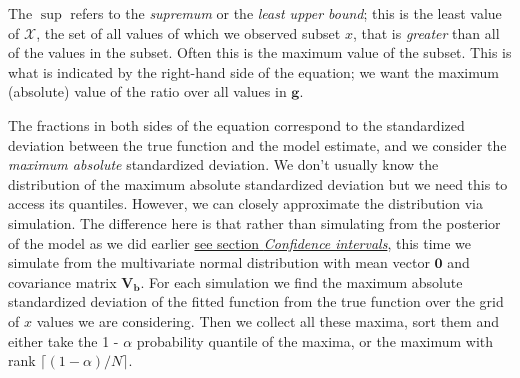 \documentclass[12pt,]{article}
\begin{document}
The \(\sup\) refers to the \emph{supremum} or the \emph{least upper
bound}; this is the least value of \(\mathcal{X}\), the set of all
values of which we observed subset \(x\), that is \emph{greater} than
all of the values in the subset. Often this is the maximum value of the
subset. This is what is indicated by the right-hand side of the
equation; we want the maximum (absolute) value of the ratio over all
values in \(\mathbf{g}\).

The fractions in both sides of the equation correspond to the
standardized deviation between the true function and the model estimate,
and we consider the \emph{maximum absolute} standardized deviation. We
don't usually know the distribution of the maximum absolute standardized
deviation but we need this to access its quantiles. However, we can
closely approximate the distribution via simulation. The difference here
is that rather than simulating from the posterior of the model as we did
earlier \protect\hyperlink{confint}{see section \emph{Confidence
intervals}}, this time we simulate from the multivariate normal
distribution with mean vector \(\mathbf{0}\) and covariance matrix
\(\mathbf{V_{b}}\). For each simulation we find the maximum absolute
standardized deviation of the fitted function from the true function
over the grid of \(x\) values we are considering. Then we collect all
these maxima, sort them and either take the 1 - \(\alpha\) probability
quantile of the maxima, or the maximum with rank
\(\lceil (1 - \alpha) / N \rceil\).
\end{document}
